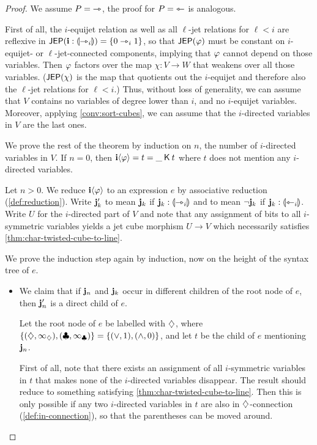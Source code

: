 \documentclass[a4paper]{article}
\begin{document}
\begin{proof}
	We assume $P = {\rightarrowtriangle}$, the proof for $P = {\leftarrowtriangle}$ is analogous.

	First of all, the $i$-equijet relation as well as all $\ell$-jet relations for $\ell < i$ are reflexive in $\mathsf{JEP}(\mathbf{i} : {\llparenthesis \rightarrowtriangle_i \rrparenthesis}) = \mathopen{}\left\{ 0 \rightarrowtriangle_i 1 \right\}\mathclose{}$, so that $\mathsf{JEP}(\varphi)$ must be constant on $i$-equijet- or $\ell$-jet-connected components, implying that $\varphi$ cannot depend on those variables.
	Then $\varphi$ factors over the map $\chi : V \to W$ that weakens over all those variables.
	($\mathsf{JEP}(\chi)$ is the map that quotients out the $i$-equijet and therefore also the $\ell$-jet relations for $\ell < i$.)
	Thus, without loss of generality, we can assume that $V$ contains no variables of degree lower than $i$, and no $i$-equijet variables.
	Moreover, applying \cref{conv:sort-cubes}, we can assume that the $i$-directed variables in $V$ are the last ones.
	
	We prove the rest of the theorem by induction on $n$, the number of $i$-directed variables in $V$.
	If $n = 0$, then $\mathbf{i} \langle \varphi \rangle = t = \_ \mathbin{\mathsf{K}} t$ where $t$ does not mention any $i$-directed variables.
	
	Let $n > 0$.
	We reduce $\mathbf{i} \langle \varphi \rangle$ to an expression $e$ by associative reduction (\cref{def:reduction}).
	Write $\mathbf{j}_k'$ to mean $\mathbf{j}_k$ if $\mathbf{j}_k : {\llparenthesis \rightarrowtriangle_i \rrparenthesis}$ and to mean $\lnot \mathbf{j}_k$ if $\mathbf{j}_k : {\llparenthesis \leftarrowtriangle_i \rrparenthesis}$.
	Write $U$ for the $i$-directed part of $V$ and note that any assignment of bits to all $i$-symmetric variables yields a jet cube morphism $U \to V$ which necessarily satisfies \cref{thm:char-twisted-cube-to-line}.
	
	We prove the induction step again by induction, now on the height of the syntax tree of $e$.
	
	\begin{itemize}
		\item We claim that if $\mathbf{j}_n$ and $\mathbf{j}_{k}$ occur in different children of the root node of $e$, then $\mathbf{j}'_n$ is a direct child of $e$.
		
		Let the root node of $e$ be labelled with $\mathbin{\diamondsuit}$, where $\mathopen{}\left\{ (\mathbin{\diamondsuit}, \infty_{\mathbin{\diamondsuit}}), (\mathbin{\clubsuit}, \infty_{\mathbin{\clubsuit}}) \right\}\mathclose{} = \mathopen{}\left\{ (\vee, 1), (\wedge, 0) \right\}\mathclose{}$, and let $t$ be the child of $e$ mentioning $\mathbf{j}_n$.
		
		First of all, note that there exists an assignment of all $i$-symmetric variables in $t$ that makes none of the $i$-directed variables disappear.
		The result should reduce to something satisfying \cref{thm:char-twisted-cube-to-line}.
		Then this is only possible if any two $i$-directed variables in $t$ are also in $\mathbin{\diamondsuit}$-connection (\cref{def:in-connection}), so that the parentheses can be moved around.
		

\end{itemize}
\end{proof}
\end{document}
